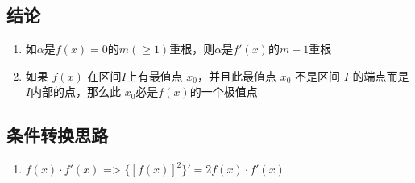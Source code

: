 \documentclass[a4paper,12pt]{article}
\begin{document}
        {\color{blue}{弯曲程度越大，曲率越大，曲率圆的半径越小}}

    \subsection{结论}

    \begin{enumerate}
        \item 如$\alpha$是$f(x) = 0$的$m(\geq 1)$重根，则$\alpha$是$f'(x)$的$m-1$重根
        \item 如果 $f(x)$ 在区间$I$上有最值点 $x_0$，并且此最值点 $x_0$ 不是区间 $I$ 的端点而是$I$内部的点，那么此 $x_0$必是$f(x)$的一个极值点
    \end{enumerate}

    \subsection{条件转换思路}

    \begin{enumerate}
        \item $f(x)\cdot f'(x)$ => $\{[f(x)]^2\}' = 2f(x) \cdot f'(x)$
    \end{enumerate}
\end{document}
